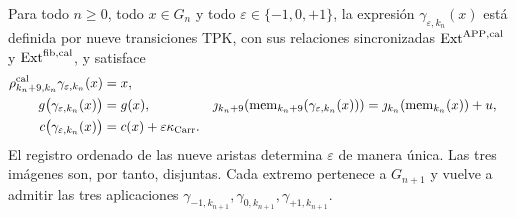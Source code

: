 \begin{lemma}
\label{hmtfg:lem:elevacion-catalogal-nonadica}
Para todo \(n\ge0\), todo \(x\in G_n\) y todo
\(\varepsilon\in\{-1,0,+1\}\), la expresión
\(\gamma_{\varepsilon,k_n}(x)\) está definida por nueve transiciones TPK,
con sus relaciones sincronizadas
\(\operatorname{Ext}^{\mathrm{APP},\rm cal}\) y
\(\operatorname{Ext}^{\rm fib,cal}\), y satisface
\begin{align}
 \rho^{\rm cal}_{k_n+9,k_n}\gamma_{\varepsilon,k_n}(x)&=x,
 \label{hmtfg:eq:truncamiento-injerto-ch}\\
 g\bigl(\gamma_{\varepsilon,k_n}(x)\bigr)
   &=g(x),&
 \jmath_{k_n+9}\!\left(\operatorname{mem}_{k_n+9}
        (\gamma_{\varepsilon,k_n}(x))\right)
   &=\jmath_{k_n}\!\left(\operatorname{mem}_{k_n}(x)\right)+u,
 \label{hmtfg:eq:fase-memoria-injerto-ch}\\
 c\bigl(\gamma_{\varepsilon,k_n}(x)\bigr)
   &=c(x)+\varepsilon\kappa_{\rm Carr}.&&
 \label{hmtfg:eq:carry-injerto-ch}
\end{align}
\label{hmtfg:eq:tres-vueltas-propiedades-ch}
\label{hmtfg:eq:tres-vueltas-acarreo-ch}
El registro ordenado de las nueve aristas determina \(\varepsilon\) de manera única.
Las tres imágenes son, por tanto, disjuntas. Cada extremo pertenece a
\(G_{n+1}\) y vuelve a admitir las tres aplicaciones
\(\gamma_{-1,k_{n+1}},\gamma_{0,k_{n+1}},
\gamma_{+1,k_{n+1}}\).
\end{lemma}

